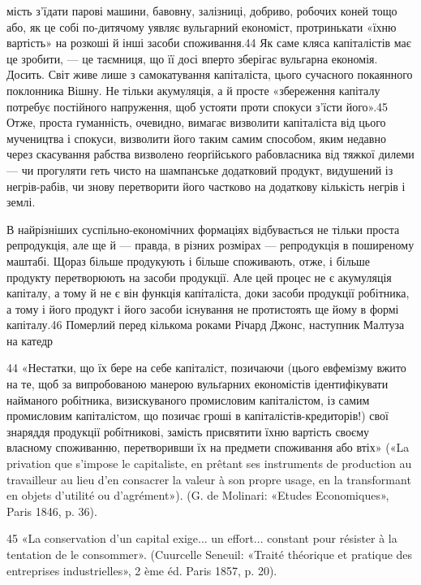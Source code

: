 мість з’їдати парові машини, бавовну, залізниці, добриво, робочих
коней тощо або, як це собі по-дитячому уявляє вульгарний
економіст, протринькати «їхню вартість» на розкоші
й інші засоби споживання.44 Як саме кляса капіталістів має
це зробити, — це таємниця, що її досі вперто зберігає вульгарна
економія. Досить. Світ живе лише з самокатування капіталіста,
цього сучасного покаянного поклонника Вішну. Не тільки
акумуляція, а й просте «збереження капіталу потребує постійного
напруження, щоб устояти проти спокуси з’їсти його».45
Отже, проста гуманність, очевидно, вимагає визволити капіталіста
від цього мучеництва і спокуси, визволити його таким самим
способом, яким недавно через скасування рабства визволено
ґеорґійського рабовласника від тяжкої дилеми — чи прогуляти
геть чисто на шампанське додатковий продукт, видушений із
негрів-рабів, чи знову перетворити його частково на додаткову
кількість негрів і землі.

В найрізніших суспільно-економічних формаціях відбувається
не тільки проста репродукція, але ще й — правда, в різних
розмірах — репродукція в поширеному маштабі. Щораз більше
продукують і більше споживають, отже, і більше продукту перетворюють
на засоби продукції. Але цей процес не є акумуляція
капіталу, а тому й не є він функція капіталіста, доки засоби продукції
робітника, а тому і його продукт і його засоби існування
не протистоять ще йому в формі капіталу.46 Померлий перед
кількома роками Річард Джонс, наступник Малтуза на катедр

44 «Нестатки, що їх бере на себе капіталіст, позичаючи (цього
евфемізму вжито на те, щоб за випробованою манерою вульґарних економістів
ідентифікувати найманого робітника, визискуваного промисловим
капіталістом, із самим промисловим капіталістом, що позичає гроші
в капіталістів-кредиторів!) свої знаряддя продукції робітникові, замість
присвятити їхню вартість своєму власному споживанню, перетворивши
їх на предмети споживання або втіх» («La privation que s’impose le
capitaliste, en prêtant ses instruments de production au travailleur au lieu
d’en consacrer la valeur à son propre usage, en la transformant en objets
d'utilité ou d’agrément»). (G. de Molinari: «Etudes Economiques», Paris
1846, p. 36).

45 «La conservation d’un capital exige... un effort... constant pour
résister à la tentation de le consommer». (Cuurcelle Seneuil: «Traité théorique
et pratique des entreprises industrielles», 2 ème éd. Paris 1857, p. 20).

